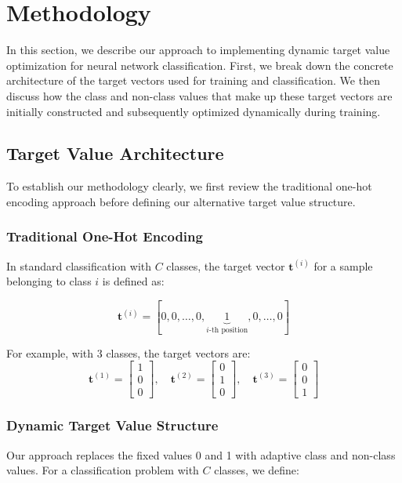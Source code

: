 \documentclass[12pt,fleqn,a4paper]{article}
\begin{document}
\section{Methodology}
In this section, we describe our approach to implementing dynamic target value optimization for neural network classification. First, we break down the concrete architecture of the target vectors used for training and classification. We then discuss how the class and non-class values that make up these target vectors are initially constructed and subsequently optimized dynamically during training.

\subsection{Target Value Architecture}

To establish our methodology clearly, we first review the traditional one-hot encoding approach before defining our alternative target value structure.

\subsubsection{Traditional One-Hot Encoding}
In standard classification with $C$ classes, the target vector $\mathbf{t}^{(i)}$ for a sample belonging to class $i$ is defined as:

$$\mathbf{t}^{(i)} = [0, 0, \ldots, 0, \underbrace{1}_{i\text{-th position}}, 0, \ldots, 0]$$

For example, with 3 classes, the target vectors are:
$$\mathbf{t}^{(1)} = \begin{bmatrix} 1 \\ 0 \\ 0 \end{bmatrix}, \quad 
\mathbf{t}^{(2)} = \begin{bmatrix} 0 \\ 1 \\ 0 \end{bmatrix}, \quad 
\mathbf{t}^{(3)} = \begin{bmatrix} 0 \\ 0 \\ 1 \end{bmatrix}$$

\subsubsection{Dynamic Target Value Structure}
Our approach replaces the fixed values 0 and 1 with adaptive class and non-class values. For a classification problem with $C$ classes, we define:
\end{document}
